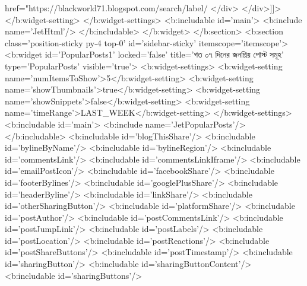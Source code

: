 {{{{href="https://blackworld71.blogspot.com/search/label/%
</div>
</div>]]></b:widget-setting>
    </b:widget-settings>
    <b:includable id='main'>
      <b:include name='JetHtml'/>
    </b:includable>
  </b:widget>
</b:section>
<b:section class='position-sticky py-4 top-0' id='sidebar-sticky' itemscope='itemscope'>
  <b:widget id='PopularPosts1' locked='false' title='গত ০৭ দিনের জনপ্রিয় পোস্ট সমূহ' type='PopularPosts' visible='true'>
    <b:widget-settings>
      <b:widget-setting name='numItemsToShow'>5</b:widget-setting>
      <b:widget-setting name='showThumbnails'>true</b:widget-setting>
      <b:widget-setting name='showSnippets'>false</b:widget-setting>
      <b:widget-setting name='timeRange'>LAST_WEEK</b:widget-setting>
    </b:widget-settings>
    <b:includable id='main'>
      <b:include name='JetPopularPosts'/>
    </b:includable>
    <b:includable id='blogThisShare'/>
    <b:includable id='bylineByName'/>
    <b:includable id='bylineRegion'/>
    <b:includable id='commentsLink'/>
    <b:includable id='commentsLinkIframe'/>
    <b:includable id='emailPostIcon'/>
    <b:includable id='facebookShare'/>
    <b:includable id='footerBylines'/>
    <b:includable id='googlePlusShare'/>
    <b:includable id='headerByline'/>
    <b:includable id='linkShare'/>
    <b:includable id='otherSharingButton'/>
    <b:includable id='platformShare'/>
    <b:includable id='postAuthor'/>
    <b:includable id='postCommentsLink'/>
    <b:includable id='postJumpLink'/>
    <b:includable id='postLabels'/>
    <b:includable id='postLocation'/>
    <b:includable id='postReactions'/>
    <b:includable id='postShareButtons'/>
    <b:includable id='postTimestamp'/>
    <b:includable id='sharingButton'/>
    <b:includable id='sharingButtonContent'/>
    <b:includable id='sharingButtons'/>
}}}}
